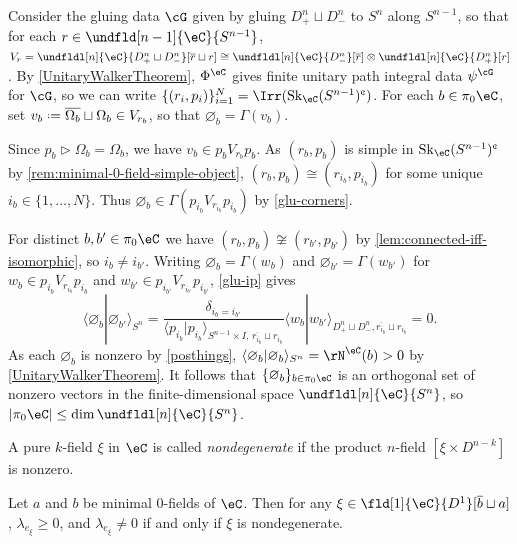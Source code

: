 \documentclass[12pt,reqno]{amsart}
\newcommand{\Sk}{\mathrm{Sk}}
\newcommand{\psn}{\Phi}
\newcommand{\C}{\eC}
\newcommand{\fcj}[1]{\overline{#1}}
\newcommand{\bkt}[2]{\langle #1|#2 \rangle}
\newcommand{\defn}[1]{\emph{#1}}
\newcommand{\cent}{\textup{\textcent}}
\renewcommand{\amalg}{\sqcup}
\DeclareRobustCommand{\coloneq}{\mathrel{\vcenter{\baselineskip0.5ex\lineskiplimit0pt\hbox{\scriptsize{\upshape.}}\hbox{\scriptsize{\upshape.}}}}=}
\begin{document}
\begin{pf}
Consider the gluing data $\cG$ given by gluing $D^n_+\amalg D^n_-$ to $S^n$ along $S^{n-1}$, so that for each $r\in\undfld[n-1]{\C}{S^{n-1}}$, $V_r = \undfldl[n]{\C}{D^n_+\amalg D^n_-}[\fcj r\amalg r] \cong \undfldl[n]{\C}{D^n_-}[\fcj r]\otimes\undfldl[n]{\C}{D^n_+}[r]$. By \cref{UnitaryWalkerTheorem}, $\psn^\C$ gives finite unitary path integral data $\psi^{\cG}$ for $\cG$, so we can write $\{(r_i,p_i)\}_{i=1}^N=\Irr(\Sk_\C(S^{n-1})^\cent)$. For each $b\in\pi_0\C$, set $v_b\coloneq\fcj{\Omega_b}\amalg\Omega_b\in V_{r_b}$, so that $\varnothing_b=\Gamma(v_b)$. 

Since $p_b\triangleright\Omega_b=\Omega_b$, we have $v_b\in p_bV_{r_b}p_b$. As $(r_b,p_b)$ is simple in $\Sk_\C(S^{n-1})^\cent$ by \cref{rem:minimal-0-field-simple-object}, $(r_b,p_b)\cong(r_{i_b},p_{i_b})$ for some unique $i_b\in\{1,\dots,N\}$. Thus $\varnothing_b\in\Gamma(p_{i_b}V_{r_{i_b}}p_{i_b})$ by \cref{glu-corners}.

For distinct $b,b'\in\pi_0\C$ we have $(r_b,p_b)\not\cong(r_{b'},p_{b'})$ by \cref{lem:connected-iff-isomorphic}, so $i_b\neq i_{b'}$. Writing $\varnothing_b=\Gamma(w_b)$ and $\varnothing_{b'}=\Gamma(w_{b'})$ for $w_b\in p_{i_b}V_{r_{i_b}}p_{i_b}$ and $w_{b'}\in p_{i_{b'}}V_{r_{i_{b'}}}p_{i_{b'}}$, \cref{glu-ip} gives
\[
\bkt{\varnothing_b}{\varnothing_{b'}}_{S^n}=\frac{\delta_{i_b=i_{b'}}}{\bkt{p_{i_b}}{p_{i_b}}_{S^{n-1}\times I,\,\fcj{r_{i_b}}\amalg r_{i_b}}}\bkt{w_b}{w_{b'}}_{D^n_+\amalg D^n_-,\fcj{r_{i_b}}\amalg r_{i_b}}=0.
\]
As each $\varnothing_b$ is nonzero by \cref{posthings}, $\bkt{\varnothing_b}{\varnothing_b}_{S^n}=\rN^\C(b)>0$ by \cref{UnitaryWalkerTheorem}. It follows that $\{\varnothing_b\}_{b\in\pi_0\C}$ is an orthogonal set of nonzero vectors in the finite-dimensional space $\undfldl[n]{\C}{S^n}$, so $|\pi_0\C|\leq\dim\undfldl[n]{\C}{S^n}$.
\end{pf}

\begin{definition}
\label{def:nondegenerate}
A pure $k$-field $\xi$ in $\C$ is called \defn{nondegenerate} if the
product $n$-field $[\xi \times D^{n-k}]$ is nonzero.
\end{definition}

\begin{lemma}\label{lem:lambda-nonneg}
Let $a$ and $b$ be minimal $0$-fields of $\C$. Then for any
$\xi \in \fld[1]{\C}{D^1}[ \fcj b \amalg a]$, $\lambda_{e_\xi} \geq 0$, and $\lambda_{e_\xi} \neq 0$ if and only if $\xi$ is nondegenerate.
\end{lemma}
\end{document}
